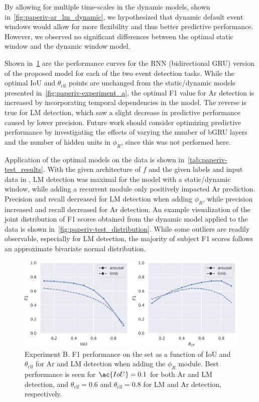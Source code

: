 By allowing for multiple time-scales in the dynamic models, shown in~\cref{fig:paperiv-ar_lm_dynamic}, we hypothesized that dynamic default event windows would allow for more flexibility and thus better predictive performance. However, we observed no significant differences between the optimal static window and the dynamic window model.

Shown in~\cref{fig:paperiv-experiment_b} are the performance curves for the \ac{RNN} (bidirectional GRU) version of the proposed model for each of the two event detection tasks. 
While the optimal \ac{IoU} and $\theta_{\mathrm{clf}}$ points are unchanged from the static/dynamic models presented in~\cref{fig:paperiv-experiment_a}, the optimal F1 value for \ac{Ar} detection is increased by incorporating temporal dependencies in the model. 
The reverse is true for \ac{LM} detection, which saw a slight decrease in predictive performance caused by lower precision. 
Future work should consider optimizing predictive performance by investigating the effects of varying the number of \ac{bGRU} layers and the number of hidden units in $\phi_{R}$, since this was not performed here.

Application of the optimal models on the \test data is shown in~\cref{tab:paperiv-test_results}. 
With the given architecture of $f$ and the given labels and input data in \train, \ac{LM} detection was maximal for the model with a static/dynamic window, while adding a recurrent module only positively impacted \ac{Ar} prediction. 
Precision and recall decreased for \ac{LM} detection when adding $\phi_{R}$, while precision increased and recall decreased for \ac{Ar} detection. 
An example visualization of the joint distribution of F1 scores obtained from the dynamic model applied to the \test data is shown in~\cref{fig:paperiv-test_distribution}. 
While some outliers are readily observable, especially for \ac{LM} detection, the majority of subject F1 scores follows an approximate bivariate normal distribution.

\begin{figure}
    \centering
    \includegraphics[width=\columnwidth]{figures/paper-iv/embc19-mros-arousal_limb-all_durations_rnn.pdf}
    \caption[Experiment B results]{Experiment B. F1 performance on the \eval set as a function of \ac{IoU} and $\theta_{\mathrm{clf}}$ for \ac{Ar} and \ac{LM} detection when adding the $\phi_{R}$ module. Best performance is seen for $\ac{IoU}=\num{0.1}$ for both \ac{Ar} and \ac{LM} detection, and $\theta_{\mathrm{clf}} = \num{0.6}$ and $\theta_{\mathrm{clf}}=\num{0.8}$ for \ac{LM} and \ac{Ar} detection, respectively.}
    \label{fig:paperiv-experiment_b}
\end{figure}

